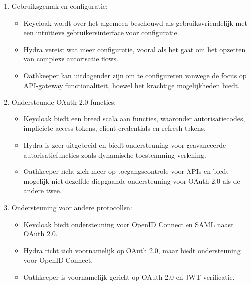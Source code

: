 \begin{enumerate}
  \item Gebruiksgemak en configuratie:
  \begin{itemize}
    \item Keycloak wordt over het algemeen beschouwd als gebruiksvriendelijk met een intuïtieve gebruikersinterface voor configuratie.
    \item Hydra vereist wat meer configuratie, vooral als het gaat om het opzetten van complexe autorisatie flows.
    \item Oathkeeper kan uitdagender zijn om te configureren vanwege de focus op API-gateway functionaliteit, hoewel het krachtige mogelijkheden biedt.
  \end{itemize}
  
  \item Ondersteunde OAuth 2.0-functies:
  \begin{itemize}
    \item Keycloak biedt een breed scala aan functies, waaronder autorisatiecodes, impliciete access tokens, client credentials en refresh tokens.
    \item Hydra is zeer uitgebreid en biedt ondersteuning voor geavanceerde autorisatiefuncties zoals dynamische toestemming verlening.
    \item Oathkeeper richt zich meer op toegangscontrole voor APIs en biedt mogelijk niet dezelfde diepgaande ondersteuning voor OAuth 2.0 als de andere twee.
  \end{itemize}
  
  \item Ondersteuning voor andere protocollen:
  \begin{itemize}
    \item Keycloak biedt ondersteuning voor OpenID Connect en SAML naast OAuth 2.0.
    \item Hydra richt zich voornamelijk op OAuth 2.0, maar biedt ondersteuning voor OpenID Connect.
    \item Oathkeeper is voornamelijk gericht op OAuth 2.0 en JWT verificatie.
  \end{itemize}
  

\end{enumerate}
